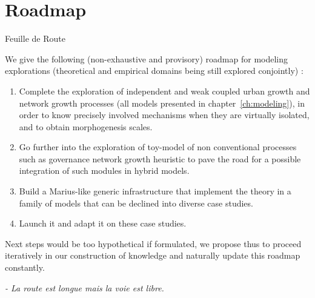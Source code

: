 


\section*{Roadmap}{Feuille de Route}


We give the following (non-exhaustive and provisory) roadmap for modeling explorations (theoretical and empirical domains being still explored conjointly) :

\begin{enumerate}
\item Complete the exploration of independent and weak coupled urban growth and network growth processes (all models presented in chapter~\ref{ch:modeling}), in order to know precisely involved mechanisms when they are virtually isolated, and to obtain morphogenesis scales.
\item Go further into the exploration of toy-model of non conventional processes such as governance network growth heuristic to pave the road for a possible integration of such modules in hybrid models.
\item Build a Marius-like generic infrastructure that implement the theory in a family of models that can be declined into diverse case studies.
\item Launch it and adapt it on these case studies.
\end{enumerate}

Next steps would be too hypothetical if formulated, we propose thus to proceed iteratively in our construction of knowledge and naturally update this roadmap constantly.

\bigskip
\bigskip
\bigskip

\textit{ - La route est longue mais la voie est libre.}














